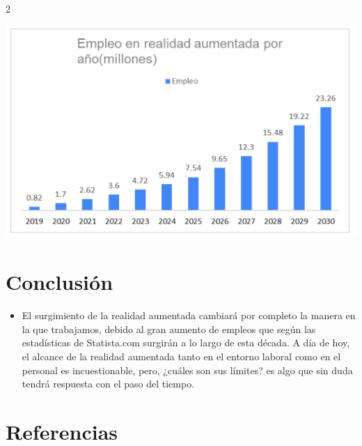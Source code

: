 \documentclass[12pt,spanish,Letterpaper,openany]{book}
\providecommand{\tightlist}{%
  \setlength{\itemsep}{0pt}\setlength{\parskip}{0pt}}
\begin{document}
\begin {multicols}{2}
\begin {flushleft}
\begin{minipage}[c]{\columnwidth}
\includegraphics[width=1\linewidth]{images/pareja27_image3}

\end{minipage}
\end {flushleft}

\hypertarget{conclusiuxf3n-1}{%
\section{Conclusión}\label{conclusiuxf3n-1}}

\begin{itemize}
\tightlist
\item
  El surgimiento de la realidad aumentada cambiará por completo la manera en la que trabajamos, debido al gran aumento de empleos que según las estadísticas de Statista.com surgirán a lo largo de esta década. A día de hoy, el alcance de la realidad aumentada tanto en el entorno laboral como en el personal es incuestionable, pero, ¿cuáles son sus límites? es algo que sin duda tendrá respuesta con el paso del tiempo.
\end{itemize}

\hypertarget{referencias-1}{%
\section{Referencias}\label{referencias-1}}


\end{multicols}
\end{document}
